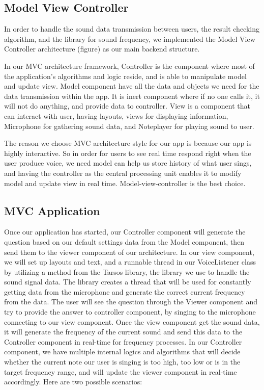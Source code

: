 \documentclass{article}
\begin{document}
\subsection{Model View Controller}
In order to handle the sound data transmission between users, the result checking algorithm, and the library for sound frequency, we implemented the Model View Controller architecture (figure) as our main backend structure.

In our MVC architecture framework, Controller is the component where most of the application’s algorithms and logic reside, and is able to manipulate model and update view. Model component have all the data and objects we need for the data transmission within the app. It is inert component where if no one calls it, it will not do anything, and provide data to controller.  View is a component that can interact with user, having layouts, views for displaying information, Microphone for gathering sound data, and Noteplayer for playing sound to user. 

The reason we choose MVC architecture style for our app is because our app is highly interactive. So  in order for users to see real time respond right when the user produce voice, we need  model can help us store history of what user sings, and having the controller as the central processing unit enables it to modify model and update view in real time. Model-view-controller is the best choice.
\subsection{MVC Application}
Once our application has started, our Controller component will generate the question based on our default settings data from the Model component, then send them to the viewer component of our architecture. In our view component, we will set up layouts and text, and a runnable thread in our VoiceListener class by utilizing a method from the Tarsos library, the library we use to handle the sound signal data. The library creates a thread that will be used for constantly getting data from the microphone and generate the correct current frequency from the data. The user will see the question through the Viewer component and try to provide the answer to controller component, by singing to the microphone connecting to our view component. Once the view component get the sound data, it will generate the frequency of the current sound and send this data to the Controller component in real-time for frequency processes. In our Controller component, we have multiple internal logics and algorithms that will decide whether the current note our user is singing is too high, too low or is in the target frequency range, and will update the viewer component in real-time accordingly. Here are two possible scenarios:
\end{document}
